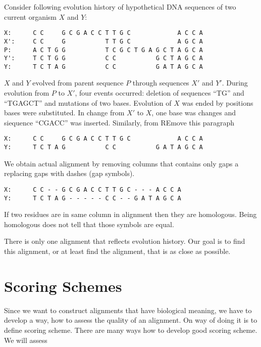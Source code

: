 \begin{example} 
Consider following evolution history of hypothetical DNA sequences of two current organism $X$ and $Y$:
\begin{verbatim}
X:      C C     G C G A C C T T G C             A C C A
X':     C C     G           T T G C             A G C A
P:      A C T G G           T C G C T G A G C T A G C A
Y':     T C T G G           C C           G C T A G C A
Y:      T C T A G           C C           G A T A G C A
\end{verbatim}
$X$ and $Y$ evolved from parent sequence $P$ through sequences $X'$ and $Y'$.
During evolution from $P$ to $X'$, four events occurred: deletion of 
sequences ``TG''  and ``TGAGCT'' and mutations of two bases. Evolution of $X$
was ended by  
positions bases were substituted. In change from $X'$ to $X$, one base was
changes and siequence ``CGACC'' was inserted.  Similarly, from 
REmove this paragraph

\begin{verbatim}
X:      C C     G C G A C C T T G C             A C C A
Y:      T C T A G           C C           G A T A G C A
\end{verbatim}
We obtain actual alignment by removing columns that contains only gaps a
replacing gaps with dashes (gap symbols). 
\begin{verbatim}
X:      C C - - G C G A C C T T G C - - - A C C A
Y:      T C T A G - - - - - C C - - G A T A G C A
\end{verbatim}
If two residues are in same column in alignment then they are homologous.
Being homologous does not tell that those symbols are equal. 
\end{example}

There is only one alignment that reflects evolution history. Our goal is to find
this alignment, or at least find the alignment, that is as close as possible.


\section{Scoring Schemes}

Since we want to construct alignments that have biological meaning, we have to
develop a way, how to assess the quality of an alignment. On way of doing it is
to define scoring scheme. There are many ways how to develop good scoring
scheme. We will assess 

